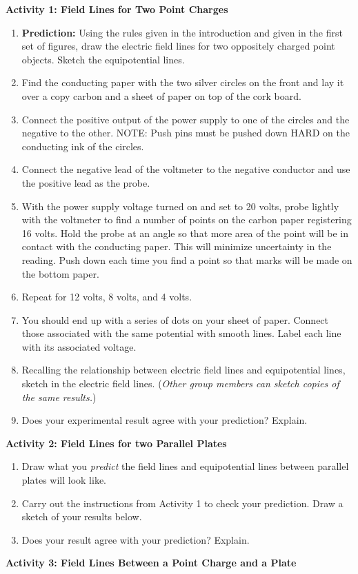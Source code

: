 \textbf{Activity 1: Field Lines for Two Point Charges}

\begin{enumerate}[wide, label=(\emph{\alph*})] 
\item\textbf{Prediction:} Using the rules given in the introduction and
given in the first set of figures, draw the electric field lines for two
oppositely charged point objects. Sketch the equipotential lines.
\answerspace{1in}

\item Find the conducting paper with the two silver circles on the front
and lay it over a copy carbon and a sheet of paper on top of the cork
board.
\item Connect the positive output of the power supply to one of the circles
and the negative to the other. NOTE: Push pins must be pushed down HARD on the 
conducting ink of the circles.
\item Connect the negative lead of the voltmeter to the negative conductor
and use the positive lead as the probe. 
\item With the power supply voltage turned on and set to 20 volts, probe
lightly with the voltmeter to find a number of points on the carbon
paper registering 16 volts. Hold the probe at an angle so that more area of the 
point will be in contact with the conducting paper. This will minimize 
uncertainty in the reading. Push down each time you find a point so
that marks will be made on the bottom paper.
\item Repeat for 12 volts, 8 volts, and 4 volts.
\item You should end up with a series of dots on your sheet of paper. Connect
those associated with the same potential with smooth lines. Label each line 
with its associated voltage.
\item Recalling the relationship between electric field lines and equipotential
lines, sketch in the electric field lines. (\emph{Other group members
can sketch copies of the same results.})
\item Does your experimental result agree with your prediction? Explain.
\answerspace{15mm}

\end{enumerate}

\pagebreak[2]
\textbf{Activity 2: Field Lines for two Parallel Plates}

\begin{enumerate}[wide, label=(\emph{\alph*})]
\item Draw what you \textit{predict} the field lines and equipotential
lines between parallel plates will look like.
\answerspace{1.2in}

\item Carry out the instructions from Activity 1 to check your prediction.  Draw a sketch of your results below.
\answerspace{1.2in}

\item Does your result agree with your prediction? Explain.
\answerspace{.5in}

\end{enumerate}
\textbf{Activity 3: Field Lines Between a Point Charge and a Plate}

